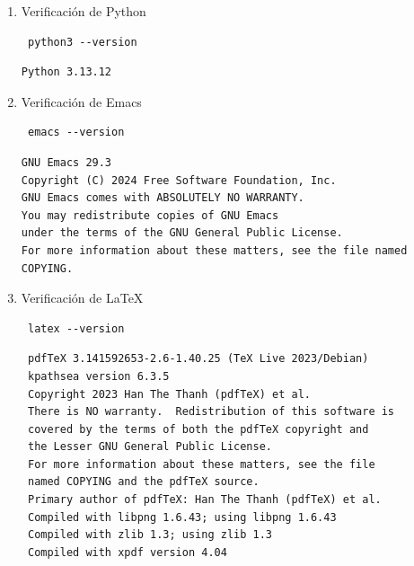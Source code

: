 \documentclass[11pt]{article}
\begin{document}
\begin{enumerate}
\item Verificación de Python
\begin{verbatim}
 python3 --version
\end{verbatim}

\begin{verbatim}
Python 3.13.12
\end{verbatim}

\item Verificación de Emacs
\begin{verbatim}
 emacs --version
\end{verbatim}

\begin{verbatim}
GNU Emacs 29.3
Copyright (C) 2024 Free Software Foundation, Inc.
GNU Emacs comes with ABSOLUTELY NO WARRANTY.
You may redistribute copies of GNU Emacs
under the terms of the GNU General Public License.
For more information about these matters, see the file named COPYING.
\end{verbatim}

\item Verificación de \LaTeX{}
\begin{verbatim}
 latex --version
\end{verbatim}

\begin{verbatim}
 pdfTeX 3.141592653-2.6-1.40.25 (TeX Live 2023/Debian)
 kpathsea version 6.3.5
 Copyright 2023 Han The Thanh (pdfTeX) et al.
 There is NO warranty.  Redistribution of this software is
 covered by the terms of both the pdfTeX copyright and
 the Lesser GNU General Public License.
 For more information about these matters, see the file
 named COPYING and the pdfTeX source.
 Primary author of pdfTeX: Han The Thanh (pdfTeX) et al.
 Compiled with libpng 1.6.43; using libpng 1.6.43
 Compiled with zlib 1.3; using zlib 1.3
 Compiled with xpdf version 4.04
\end{verbatim}
\end{enumerate}
\end{document}
